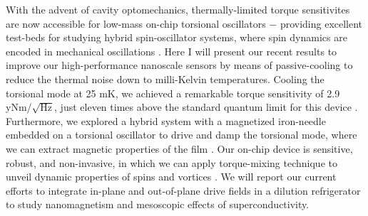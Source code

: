 With the advent of cavity optomechanics, thermally-limited torque sensitivites are now accessible for low-mass on-chip torsional oscillators $-$ providing excellent test-beds for studying hybrid spin-oscillator systems, where spin dynamics are encoded in mechanical oscillations \cite{Kim_2013}. Here I will present our recent results to improve our high-performance nanoscale sensors by means of passive-cooling to reduce the thermal noise down to milli-Kelvin temperatures. Cooling the torsional mode at 25 mK, we achieved a remarkable torque sensitivity of 2.9 yNm/$\sqrt{\text{Hz}}$, just eleven times above the standard quantum limit for this device \cite{Kim_2016}. Furthermore, we explored a hybrid system with a magnetized iron-needle embedded on a torsional oscillator to drive and damp the torsional mode, where we can extract magnetic properties of the film \cite{Kim_2017}. Our on-chip device is sensitive, robust, and non-invasive, in which we can apply torque-mixing technique to unveil dynamic properties of spins and vortices \cite{Losby_2015}. We will report our current efforts to integrate in-plane and out-of-plane drive fields in a dilution refrigerator to study nanomagnetism and mesoscopic effects of superconductivity.